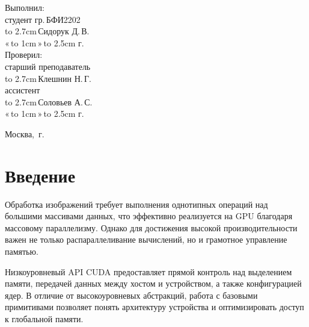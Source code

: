 \documentclass[14pt]{extarticle}
\makeatletter
\newcommand{\hrf}[1]{\hbox to #1{\hrulefill}} %
\newcounter{sectionc} %
\newcommand{\numbersections}{\renewcommand{\Hy@numberline}[1]{##1~}}
\newcommand{\nonumbersections}{\renewcommand{\Hy@numberline}[1]{}}
\let\oldsection\section
\renewcommand{\section}{\numbersections\oldsection}
\let\oldsectionc\sectionc
\renewcommand{\sectionc}{\nonumbersections\oldsectionc}
\renewcommand\tableofcontents{
	\pdfbookmark[sectionc]{\contentsname}{toc} %
	\sectionc*{\contentsname
		\@mkboth{\contentsname}{\contentsname}}
	\@starttoc{toc}
}
\makeatother
\begin{document}
\vfill %

\hfill %
\begin{minipage}{0.45\textwidth} %
	Выполнил:\\[2mm]
	студент гр.\,БФИ2202\\[2mm]
	\hrf{2.7cm}\,Сидорук Д.\,В.\\[2mm]
	«\,\hrf{1cm}\,»\,\hrf{2.5cm}\,\the\year{}\,г.\\[5mm]
	
	Проверил:\\[2mm]
	старший преподаватель\\[2mm]
	\hrf{2.7cm}\,Клешнин Н.\,Г.\\[2mm]
	ассистент\\[2mm]
	\hrf{2.7cm}\,Соловьев А.\,С.\\[2mm]
	«\,\hrf{1cm}\,»\,\hrf{2.5cm}\,\the\year{}\,г.
\end{minipage}%

\vfill

\centerline{Москва, \the\year{}\,г.} %
\thispagestyle{empty} %
\newpage %
\tableofcontents %
\newpage %

\section{Введение}

Обработка изображений требует выполнения однотипных операций над большими массивами данных, что эффективно реализуется на GPU благодаря массовому параллелизму. Однако для достижения высокой производительности важен не только распараллеливание вычислений, но и грамотное управление памятью.

Низкоуровневый API CUDA предоставляет прямой контроль над выделением памяти, передачей данных между хостом и устройством, а также конфигурацией ядер. В отличие от высокоуровневых абстракций, работа с базовыми примитивами позволяет понять архитектуру устройства и оптимизировать доступ к глобальной памяти.
\end{document}
